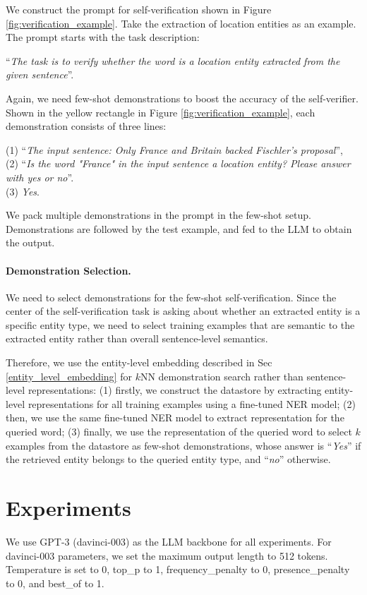 \documentclass{article}
\begin{document}
We construct the prompt for self-verification shown in Figure \ref{fig:verification_example}. 
Take the extraction of location entities as an example. 
The prompt starts with the task description:

“\textit{The task is to verify whether the word is a location entity extracted from the given sentence}”. 

Again, we need few-shot demonstrations to boost the accuracy of the self-verifier. 
Shown in the yellow rectangle in Figure \ref{fig:verification_example}, 
each demonstration consists of three lines: 

\noindent (1) “\textit{The input sentence: Only France and Britain backed Fischler's proposal}”, \\
(2) “\textit{Is the word "France" in the input sentence a location entity? Please answer with yes or no}”. \\
(3) \textit{Yes}.

We pack multiple demonstrations in the prompt in the few-shot setup. Demonstrations are followed by the test example, and fed to the LLM to obtain the output.

\paragraph{Demonstration Selection.}
We need to select demonstrations for the few-shot self-verification. 
Since the center of the self-verification task is asking about whether an extracted entity is a specific entity type, 
we need to select training examples that are semantic to the extracted entity rather than overall sentence-level semantics. 

Therefore, we use the entity-level embedding described in 
Sec \ref{entity_level_embedding} for $k$NN demonstration search rather than sentence-level representations: (1) firstly, we construct the datastore by extracting entity-level representations for all training examples using a fine-tuned NER model; (2) then, we use the same fine-tuned NER model to extract representation for the queried word; (3) finally, we use the representation of the queried word to select $k$ examples from the datastore as few-shot demonstrations, whose answer is “\textit{Yes}” if the retrieved entity belongs to the queried entity type, 
and  “\textit{no}”  otherwise. 


\section{Experiments}
\label{experiments}
We use GPT-3 \cite{brown2020language} (davinci-003) as the LLM backbone for all experiments. 
For davinci-003 parameters, we set the maximum output length to 512 tokens. Temperature is set to 0, 
top\_p to 1, frequency\_penalty to 0, presence\_penalty to 0, and best\_of to 1.
\end{document}

